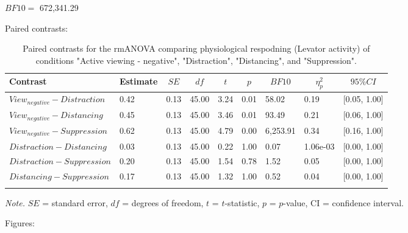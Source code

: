 \documentclass[
  man,floatsintext]{apa6}
\begin{document}
\(BF10=\) 672,341.29

Paired contrasts:

\begin{table}[H]

\begin{center}
\begin{threeparttable}

\caption{\label{tab:unnamed-chunk-9}Paired contrasts for the rmANOVA comparing physiological respodning (Levator activity) of conditions "Active viewing - negative", "Distraction", "Distancing", and "Suppression".}

\begin{tabular}{lllllllll}
\toprule
Contrast & \multicolumn{1}{c}{Estimate} & \multicolumn{1}{c}{$SE$} & \multicolumn{1}{c}{$df$} & \multicolumn{1}{c}{$t$} & \multicolumn{1}{c}{$p$} & \multicolumn{1}{c}{$BF10$} & \multicolumn{1}{c}{$\eta_{p}^{2}$} & \multicolumn{1}{c}{$95\% CI$}\\
\midrule
$View_{negative} - Distraction$ & 0.42 & 0.13 & 45.00 & 3.24 & 0.01 & 58.02 & 0.19 & {}[0.05, 1.00]\\
$View_{negative} - Distancing$ & 0.45 & 0.13 & 45.00 & 3.46 & 0.01 & 93.49 & 0.21 & {}[0.06, 1.00]\\
$View_{negative} - Suppression$ & 0.62 & 0.13 & 45.00 & 4.79 & 0.00 & 6,253.91 & 0.34 & {}[0.16, 1.00]\\
$Distraction - Distancing$ & 0.03 & 0.13 & 45.00 & 0.22 & 1.00 & 0.07 & 1.06e-03 & {}[0.00, 1.00]\\
$Distraction - Suppression$ & 0.20 & 0.13 & 45.00 & 1.54 & 0.78 & 1.52 & 0.05 & {}[0.00, 1.00]\\
$Distancing - Suppression$ & 0.17 & 0.13 & 45.00 & 1.32 & 1.00 & 0.52 & 0.04 & {}[0.00, 1.00]\\
\bottomrule
\addlinespace
\end{tabular}

\begin{tablenotes}[para]
\normalsize{\textit{Note.} $SE$ = standard error, $df$ = degrees of freedom, $t$ = $t$-statistic, $p$ = $p$-value, CI = confidence interval.}
\end{tablenotes}

\end{threeparttable}
\end{center}

\end{table}

Figures:
\end{document}
